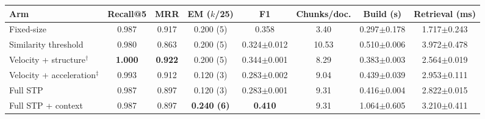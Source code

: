 \begin{tabular*}{\textwidth}{@{\extracolsep{\fill}}lccccccc@{}}
\toprule
Arm & Recall@5 & MRR & EM ($k$/25) & F1 & Chunks/doc. & Build (s) & Retrieval (ms) \\
\midrule
Fixed-size & 0.987 & 0.917 & 0.200 (5) & 0.358 & 3.40 & 0.297{\scriptsize$\pm$0.178} & 1.717{\scriptsize$\pm$0.243} \\
Similarity threshold & 0.980 & 0.863 & 0.200 (5) & 0.324{\scriptsize$\pm$0.012} & 10.53 & 0.510{\scriptsize$\pm$0.006} & 3.972{\scriptsize$\pm$0.478} \\
Velocity + structure$^{\dagger}$ & \textbf{1.000} & \textbf{0.922} & 0.200 (5) & 0.344{\scriptsize$\pm$0.001} & 8.29 & 0.383{\scriptsize$\pm$0.003} & 2.564{\scriptsize$\pm$0.019} \\
Velocity + acceleration$^{\ddagger}$ & 0.993 & 0.912 & 0.120 (3) & 0.283{\scriptsize$\pm$0.002} & 9.04 & 0.439{\scriptsize$\pm$0.039} & 2.953{\scriptsize$\pm$0.111} \\
Full STP & 0.987 & 0.897 & 0.120 (3) & 0.283{\scriptsize$\pm$0.001} & 9.31 & 0.416{\scriptsize$\pm$0.004} & 2.822{\scriptsize$\pm$0.015} \\
Full STP + context & 0.987 & 0.897 & \textbf{0.240 (6)} & \textbf{0.410} & 9.31 & 1.064{\scriptsize$\pm$0.605} & 3.210{\scriptsize$\pm$0.411} \\
\bottomrule
\end{tabular*}
